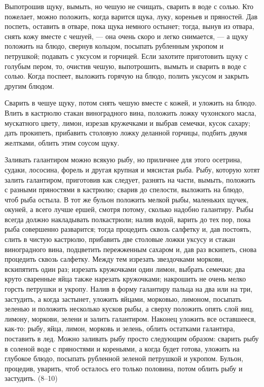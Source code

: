
Выпотрошив щуку, вымыть, но чешую не счищать, сварить в воде с солью. Кто пожелает, можно положить, когда варится щука, луку, кореньев и пряностей. Дав поспеть, оставить в отваре, пока щука немного остынет; тогда, вынув из отвара, снять кожу вместе с чешуей, — она очень скоро и легко снимается, — а щуку положить на блюдо, свернув кольцом, посыпать рубленным укропом и петрушкой; подавать с уксусом и горчицей. Если захотите приготовить щуку с голубым пером, то, очистив чешую, выпотрошить, вымыть и сварить в воде с солью. Когда поспеет, выложить горячую на блюдо, полить уксусом и закрыть другим блюдом.


Сварить в чешуе щуку, потом снять чешую вместе с кожей, и уложить на блюдо. Влить в кастрюлю стакан виноградного вина, положить ложку чухонского масла, мускатного цвету, лимон, изрезав кружечками и выбрав семечки, кусок сахару; дать прокипеть, прибавить столовую ложку деланной горчицы, подбить двумя желтками, облить этим соусом щуку.


Заливать галантиром можно всякую рыбу, но приличнее для этого осетрина, судаки, лососина, форель и другая крупная и мясистая рыба. Рыбу, которую хотят залить галантиром, приготовив как следует, разнять на части, вымыть, положить с разными пряностями в кастрюлю; сварив до спелости, выложить на блюдо, чтоб рыба остыла. В тот же бульон положить мелкой рыбы, маленьких щучек, окуней, а всего лучше ершей, смотря потому, сколько надобно галантиру. Рыбы всегда должно накладывать полкастрюли; налив водой, варить до тех пор, пока рыба совершенно разварится; тогда процедить сквозь салфетку и, дав постоять, слить в чистую кастрюлю, прибавить две столовые ложки уксусу и стакан виноградного вина, подцветить пережженным сахаром и, дав раз вскипеть, снова процедить сквозь салфетку. Между тем изрезать звездочками моркови, вскипятить один раз; изрезать кружочками один лимон, выбрать семечки; два круто сваренные яйца также нарезать кружочками; накрошить не очень мелко горсть петрушки и укропу. Налив в форму галантиру пальца на два или на три, застудить, а когда застынет, уложить яйцами, морковью, лимоном, посыпать зеленью и положить несколько кусков рыбы, а сверху положить опять слой яиц, лимону, моркови, зелени и залить галантиром. Наконец уложить все оставшееся, как-то: рыбу, яйца, лимон, морковь и зелень, облить остатками галантира, поставить в лед. Можно заливать рыбу просто следующим образом: сварить рыбу в соленой воде с пряностями и кореньями, а когда будет готова, уложить на глубокое блюдо, посыпать рубленной зеленой петрушкой и укропом. Бульон, процедив, уварить, чтоб осталось его только половина, потом облить рыбу и застудить. (8--10)


